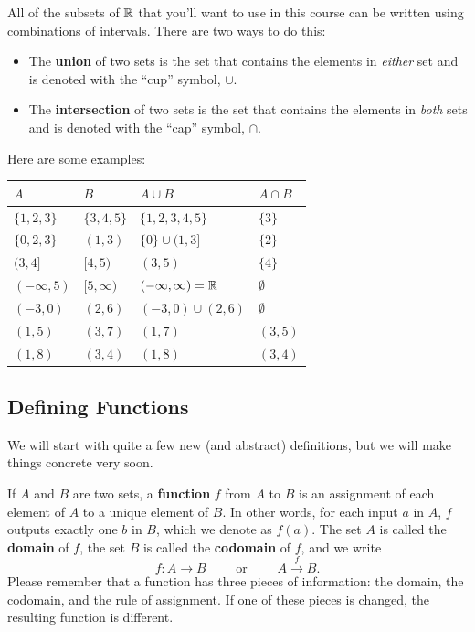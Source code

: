All of the subsets of $\mathbb{R}$ that you'll want to use in this course can be written using combinations of intervals. There are two ways to do this:
\begin{itemize}
\item The \textbf{union} of two sets is the set that contains the elements in \textit{either} set and is denoted with the ``cup'' symbol, $\cup$.
\item The \textbf{intersection} of two sets is the set that contains the elements in \textit{both} sets and is denoted with the ``cap'' symbol, $\cap$.
\end{itemize}
Here are some examples:
\begin{center}
\renewcommand{\arraystretch}{1.1}
\begin{tabular}{@{}l l l l @{}}
\toprule[0.4mm]
$A$ & $B$ & $A\cup B$ & $A\cap B$\\
\midrule
$\{1, 2, 3\}$ & $\{3, 4, 5\}$ & $\{1,2,3,4,5\}$ & $\{3\}$ \\
$\{0, 2, 3\}$ & $(1,3)$ & $\{0\}\cup(1,3]$ & $\{2\}$\\
$(3,4]$ & $[4,5)$ & $(3,5)$ & $\{4\}$ \\
$(-\infty,5)$ & $[5,\infty)$ & $(-\infty,\infty)=\mathbb{R}$ & $\emptyset$ \\
$(-3,0)$ & $(2,6)$ & $(-3,0) \cup (2,6)$ & $\emptyset$ \\
$(1,5)$ & $(3, 7)$ & $(1,7)$ & $(3,5)$ \\
$(1,8)$ & $(3, 4)$ & $(1,8)$ & $(3,4)$ \\
\bottomrule
\end{tabular}
\end{center}

\subsection{Defining Functions}

We will start with quite a few new (and abstract) definitions, but we will make things concrete very soon.

If $A$ and $B$ are two sets, a \textbf{function} $f$ from $A$ to $B$ is an assignment of each element of $A$ to a unique element of $B$. In other words, for each input $a$ in $A$, $f$ outputs exactly one $b$ in $B$, which we denote as $f(a)$. The set $A$ is called the \textbf{domain} of $f$, the set $B$ is called the \textbf{codomain} of $f$, and we write $$f:A\to B\quad\quad\text{ or }\quad\quad A\overset{f}{\to} B.$$
Please remember that a function has three pieces of information: the domain, the codomain, and the rule of assignment. If one of these pieces is changed, the resulting function is different. 

